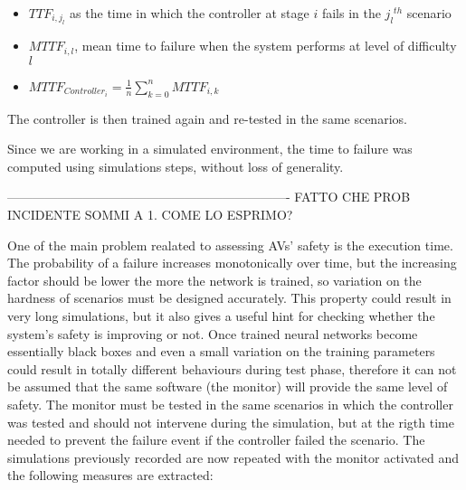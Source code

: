 \begin{itemize}
	\item $TTF_{i,j_{l}}$ as the time in which the controller at stage $i$ fails in the ${j_{l}}^{th}$ scenario
	\item $MTTF_{i,l}$, mean time to failure when the system performs at level of difficulty $l$
	\item $MTTF_{Controller_{i}} = \frac{1}{n} \sum_{k = 0}^{n} MTTF_{i,k}$
\end{itemize}

The controller is then trained again and re-tested in the same scenarios. 

Since we are working in a simulated environment, the time to failure was computed using simulations steps, without loss of generality.\newline 

-------------------------------------------------------------------        FATTO CHE PROB INCIDENTE SOMMI A 1. COME LO ESPRIMO?\newline

One of the main problem realated to assessing AVs' safety is the execution time. The probability of a failure increases monotonically over time, but the increasing factor should be lower the more the network is trained, so variation on the hardness of scenarios must be designed accurately. This property could result in very long simulations, but it also gives a useful hint for checking whether the system's safety is improving or not. \newline\newline
Once trained neural networks become essentially black boxes and even a small variation on the training parameters could result in totally different behaviours during test phase, therefore it can not be assumed that the same software (the monitor) will provide the same level of safety.\newline
The monitor must be tested in the same scenarios in which the controller was tested and should not intervene during the simulation, but at the rigth time needed to prevent the failure event if the controller failed the scenario. The simulations previously recorded are now repeated with the monitor activated and the following measures are extracted:

